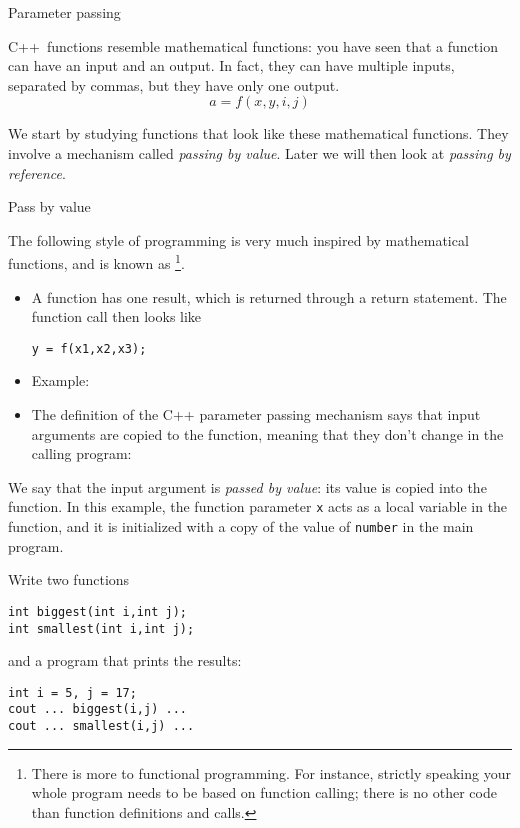  {Parameter passing}
\label{sec:passing}
%

C++~functions resemble mathematical functions: you have seen that a
function can have an input and an output. In fact, they can have
multiple inputs, separated by commas, but they have only one
output.
\[ a = f(x,y,i,j) \]

We start by studying functions that look like these mathematical
functions. They involve a  mechanism
called
\emph{passing by value}.
%
Later we will then look at
\emph{passing by reference}.

 {Pass by value}
\label{sec:pass-value}

The following style of programming is very much inspired by
mathematical functions, and is known as \footnote {There is more to functional programming. For
  instance, strictly speaking your whole program needs to be based on
  function calling; there is no other code than function definitions
  and calls.}.
\begin{itemize}
\item A function has one result, which is returned through a return
  statement. The function call then looks like
\begin{lstlisting}
y = f(x1,x2,x3);
\end{lstlisting}
\item Example:
\item The definition of the C++ parameter passing mechanism says that
  input arguments are copied to the function, meaning that they don't
  change in the calling program:

\end{itemize}

We say that the input argument is
\emph{passed by value}:
its value is copied into the
function.  In this example, the function parameter \lstinline{x} acts as a
local variable in the function, and it is initialized with a copy of
the value of \lstinline{number} in the main program.

\begin{exercise}
  \label{ex:swapbyvalue}
  Write two functions
\begin{lstlisting}
int biggest(int i,int j);
int smallest(int i,int j);
\end{lstlisting}
  and a program that prints the results:
\begin{lstlisting}
int i = 5, j = 17;
cout ... biggest(i,j) ...
cout ... smallest(i,j) ...
\end{lstlisting}
\end{exercise}

